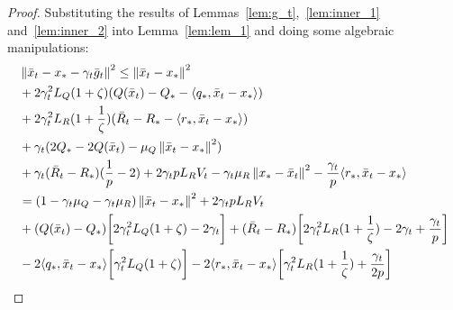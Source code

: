 \begin{proof} Substituting the results of Lemmas~\ref{lem:g_t},~\ref{lem:inner_1} and~\ref{lem:inner_2} into Lemma~\ref{lem:lem_1} and doing some algebraic manipulations:
    \begin{align}
        \begin{split}
            &\left\|\bar{x}_t - x_* - \gamma_{t} \bar{g}_t\right\|^2 \leq \left\|\bar{x}_t - x_*\right\|^2 \\
            &+ 2\gamma_{t}^2 L_Q (1 + \zeta) (Q(\bar{x}_t) - Q_* - \langle q_*, \bar{x}_t - x_*\rangle) \\
            &+ 2\gamma_{t}^2 L_R (1 + \frac{1}{\zeta}) (\bar{R}_t - R_* - \langle r_*, \bar{x}_t - x_*\rangle) \\
            &+ \gamma_{t} ( 2 Q_* - 2 Q(\bar{x}_t) - \mu_Q \left\|\bar{x}_t - x_*\right\|^2 ) \\
            &+ \gamma_{t}(\bar{R}_t - R_*)(\frac{1}{p} - 2) + 2 \gamma_{t} p L_R V_t - \gamma_{t} \mu_R \left\|x_* - \bar{x}_t\right\|^2 - \frac{\gamma_{t}}{p}\langle r_*, \bar{x}_t - x_*\rangle\\
            &= (1 - \gamma_{t} \mu_Q - \gamma_{t} \mu_R)\left\|\bar{x}_t - x_*\right\|^2 + 2 \gamma_{t} p L_R V_t \\
            &+ (Q(\bar{x}_t) - Q_*)\biggr[ 2\gamma_{t}^2 L_Q (1+\zeta) - 2\gamma_{t} \biggr]
            + (\bar{R}_t - R_*)\biggr[ 2\gamma_{t}^2 L_R (1+\frac{1}{\zeta}) - 2\gamma_{t} + \frac{\gamma_{t}}{p} \biggr] \\
            &- 2\langle q_*, \bar{x}_t - x_*\rangle\biggr[ \gamma_{t}^2 L_Q(1+\zeta) \biggr]
            - 2\langle r_*, \bar{x}_t - x_*\rangle\biggr[ \gamma_{t}^2 L_R(1+\frac{1}{\zeta}) + \frac{\gamma_{t}}{2p} \biggr] \label{eq:lol}
        \end{split}
    \end{align}
    

\end{proof}
